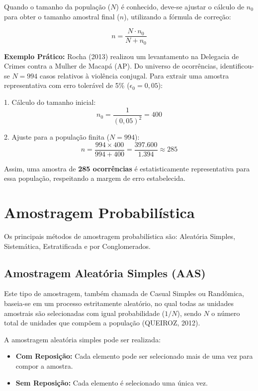 Quando o tamanho da população ($N$) é conhecido, deve-se ajustar o cálculo de $n_{0}$ para obter o tamanho amostral final ($n$), utilizando a fórmula de correção:

\begin{equation}\label{eq:n_final}
n = \frac{N \cdot n_{0}}{N + n_{0}}
\end{equation}

\textbf{Exemplo Prático:}
Rocha (2013) realizou um levantamento na Delegacia de Crimes contra a Mulher de Macapá (AP). Do universo de ocorrências, identificou-se $N = 994$ casos relativos à violência conjugal. Para extrair uma amostra representativa com erro tolerável de 5\% ($\epsilon_0 = 0,05$): \vskip0.3cm


1. Cálculo do tamanho inicial:
\begin{equation}
    n_{0}= \frac{1}{(0,05)^2} = 400
\end{equation}

2. Ajuste para a população finita ($N = 994$):
\begin{equation}
    n = \frac{994 \times 400}{994 + 400} = \frac{397.600}{1.394} \approx 285
\end{equation}

Assim, uma amostra de \textbf{285 ocorrências} é estatisticamente representativa para essa população, respeitando a margem de erro estabelecida.

\section{Amostragem Probabilística}

Os principais métodos de amostragem probabilística são: Aleatória Simples, Sistemática, Estratificada e por Conglomerados.

\subsection{Amostragem Aleatória Simples (AAS)}

Este tipo de amostragem, também chamada de Casual Simples ou Randômica, baseia-se em um processo estritamente aleatório, no qual todas as unidades amostrais são selecionadas com igual probabilidade ($1/N$), sendo $N$ o número total de unidades que compõem a população (QUEIROZ, 2012).
\vskip0.3cm

A amostragem aleatória simples pode ser realizada:
\begin{itemize}
    \item \textbf{Com Reposição:} Cada elemento pode ser selecionado mais de uma vez para compor a amostra.
    \item \textbf{Sem Reposição:} Cada elemento é selecionado uma única vez.
\end{itemize}
\vskip0.3cm

